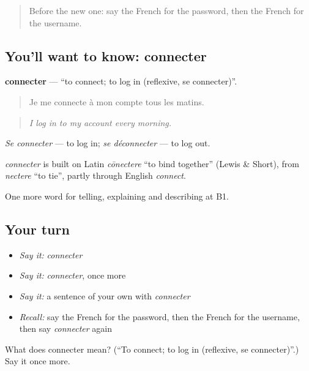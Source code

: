 \begin{quote}
Before the new one: say the French for the password, then the French for the username.
\end{quote}

\subsection*{You'll want to know: connecter}
\textbf{connecter} — \textquotedblleft{}to connect; to log in (reflexive, se connecter)\textquotedblright{}.

\begin{quote}
Je me connecte à mon compte tous les matins.
\end{quote}

\begin{quote}
\emph{I log in to my account every morning.}
\end{quote}

\emph{Se connecter} — to log in; \emph{se déconnecter} — to log out.

\begin{cousinweb}
\emph{connecter} is built on Latin \emph{cōnectere} \textquotedblleft{}to bind together\textquotedblright{} (Lewis \& Short), from \emph{nectere} \textquotedblleft{}to tie\textquotedblright{}, partly through English \emph{connect}.
\end{cousinweb}

\begin{grammarlens}[title={What you've built}]
One more word for telling, explaining and describing at B1.
\end{grammarlens}

\subsection*{Your turn}
\begin{itemize}
\raggedright
  \item \emph{Say it:} \emph{connecter}
  \item \emph{Say it:} \emph{connecter}, once more
  \item \emph{Say it:} a sentence of your own with \emph{connecter}
  \item \emph{Recall:} say the French for the password, then the French for the username, then say \emph{connecter} again
\end{itemize}

\begin{tcolorbox}[breakable,colback=teal!4,colframe=teal!35!black,title={Before you move on}]
What does connecter mean? (\textquotedblleft{}To connect; to log in (reflexive, se connecter)\textquotedblright{}.) Say it once more.
\end{tcolorbox}
